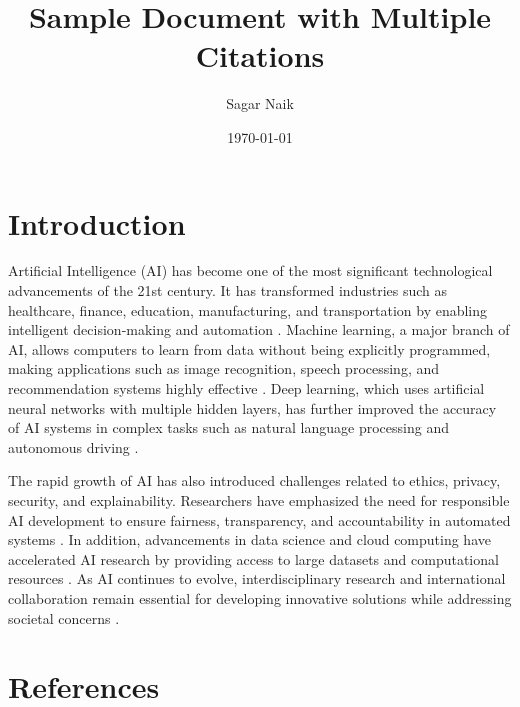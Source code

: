\documentclass[12pt]{article}
\title{Sample Document with Multiple Citations}
\author{Sagar Naik}
\date{\today}
\begin{document}
\maketitle

\section{Introduction}

Artificial Intelligence (AI) has become one of the most significant technological
advancements of the 21st century. It has transformed industries such as healthcare,
finance, education, manufacturing, and transportation by enabling intelligent
decision-making and automation \cite{russell,norvig,mccarthy}. Machine learning,
a major branch of AI, allows computers to learn from data without being explicitly
programmed, making applications such as image recognition, speech processing,
and recommendation systems highly effective \cite{bishop,mitchell}. Deep learning,
which uses artificial neural networks with multiple hidden layers, has further
improved the accuracy of AI systems in complex tasks such as natural language
processing and autonomous driving \cite{goodfellow,lecun}.

The rapid growth of AI has also introduced challenges related to ethics, privacy,
security, and explainability. Researchers have emphasized the need for responsible
AI development to ensure fairness, transparency, and accountability in automated
systems \cite{floridi,bostrom}. In addition, advancements in data science and
cloud computing have accelerated AI research by providing access to large datasets
and computational resources \cite{han}. As AI continues to evolve, interdisciplinary
research and international collaboration remain essential for developing innovative
solutions while addressing societal concerns \cite{knuth}.

\section{References}
\end{document}
